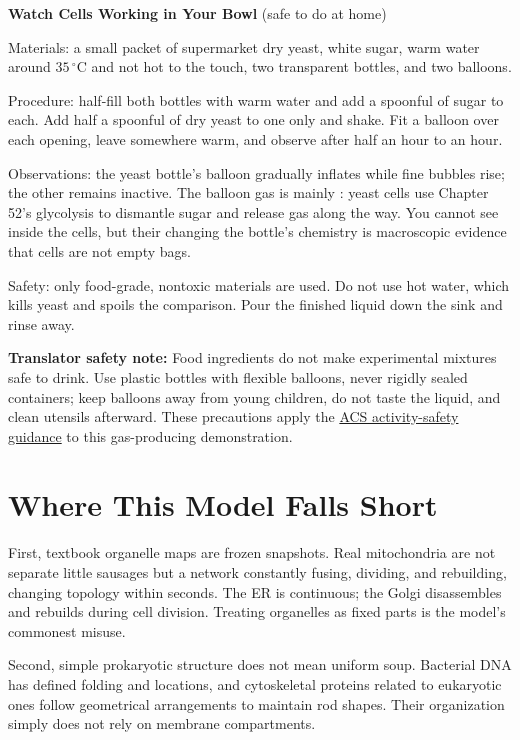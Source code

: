 \begin{shiyan}
\textbf{Watch Cells Working in Your Bowl} (safe to do at home)

Materials: a small packet of supermarket dry yeast, white sugar, warm water around $35\,^{\circ}\mathrm{C}$ and not hot to the touch, two transparent bottles, and two balloons.

Procedure: half-fill both bottles with warm water and add a spoonful of sugar to each. Add half a spoonful of dry yeast to one only and shake. Fit a balloon over each opening, leave somewhere warm, and observe after half an hour to an hour.

Observations: the yeast bottle's balloon gradually inflates while fine bubbles rise; the other remains inactive. The balloon gas is mainly : yeast cells use Chapter 52's glycolysis to dismantle sugar and release gas along the way. You cannot see inside the cells, but their changing the bottle's chemistry is macroscopic evidence that cells are not empty bags.

Safety: only food-grade, nontoxic materials are used. Do not use hot water, which kills yeast and spoils the comparison. Pour the finished liquid down the sink and rinse away.

\textbf{Translator safety note:} Food ingredients do not make experimental mixtures safe to drink. Use plastic bottles with flexible balloons, never rigidly sealed containers; keep balloons away from young children, do not taste the liquid, and clean utensils afterward. These precautions apply the \href{https://www.acs.org/education/celebrating-chemistry-editions/2024-ccew/science-safety-tips.html}{ACS activity-safety guidance} to this gas-producing demonstration.
\end{shiyan}

\section{Where This Model Falls Short}

First, textbook organelle maps are frozen snapshots. Real mitochondria are not separate little sausages but a network constantly fusing, dividing, and rebuilding, changing topology within seconds. The ER is continuous; the Golgi disassembles and rebuilds during cell division. Treating organelles as fixed parts is the model's commonest misuse.

Second, simple prokaryotic structure does not mean uniform soup. Bacterial DNA has defined folding and locations, and cytoskeletal proteins related to eukaryotic ones follow geometrical arrangements to maintain rod shapes. Their organization simply does not rely on membrane compartments.

